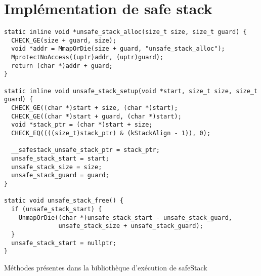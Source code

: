 \chapter{Implémentation de \og safe stack \fg}
\label{chap:implSafeStack4}





\begin{listing}
	\begin{verbatim}
static inline void *unsafe_stack_alloc(size_t size, size_t guard) {
  CHECK_GE(size + guard, size);
  void *addr = MmapOrDie(size + guard, "unsafe_stack_alloc");
  MprotectNoAccess((uptr)addr, (uptr)guard);
  return (char *)addr + guard;
}

static inline void unsafe_stack_setup(void *start, size_t size, size_t guard) {
  CHECK_GE((char *)start + size, (char *)start);
  CHECK_GE((char *)start + guard, (char *)start);
  void *stack_ptr = (char *)start + size;
  CHECK_EQ((((size_t)stack_ptr) & (kStackAlign - 1)), 0);

  __safestack_unsafe_stack_ptr = stack_ptr;
  unsafe_stack_start = start;
  unsafe_stack_size = size;
  unsafe_stack_guard = guard;
}

static void unsafe_stack_free() {
  if (unsafe_stack_start) {
    UnmapOrDie((char *)unsafe_stack_start - unsafe_stack_guard,
               unsafe_stack_size + unsafe_stack_guard);
  }
  unsafe_stack_start = nullptr;
}
	\end{verbatim}
	\caption{Méthodes présentes dans la bibliothèque d'exécution de \og \gls{safeStack} \fg}
	\label{lst:safeStackRuntime}
\end{listing}
